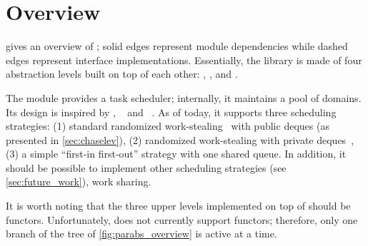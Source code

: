\section{Overview}



 gives an overview of \Parabs; solid edges represent module dependencies while dashed edges represent interface implementations.
Essentially, the library is made of four abstraction levels built on top of each other: , ,  and .

The  module provides a task scheduler; internally, it maintains a pool of domains.
Its design is inspired by \Domainslib, \Taskflow~\citep{DBLP:journals/tpds/HuangLLL22} and \Moonpool~\citep{moonpool}.
As of today, it supports three scheduling strategies:
(1) standard randomized work-stealing~\citep{DBLP:journals/jacm/BlumofeL99} with public deques (as presented in \cref{sec:chaselev}),
(2) randomized work-stealing with private deques~\citep{DBLP:conf/ppopp/AcarCR13},
(3) a simple ``first-in first-out'' strategy with one shared queue.
In addition, it should be possible to implement other scheduling strategies (see \cref{sec:future_work}), \eg work sharing.

%
It is worth noting that the three upper levels implemented on top of  should be \OCaml functors.
Unfortunately, \ZooLang does not currently support functors; therefore, only one branch of the tree of \cref{fig:parabs_overview} is active at a time.
